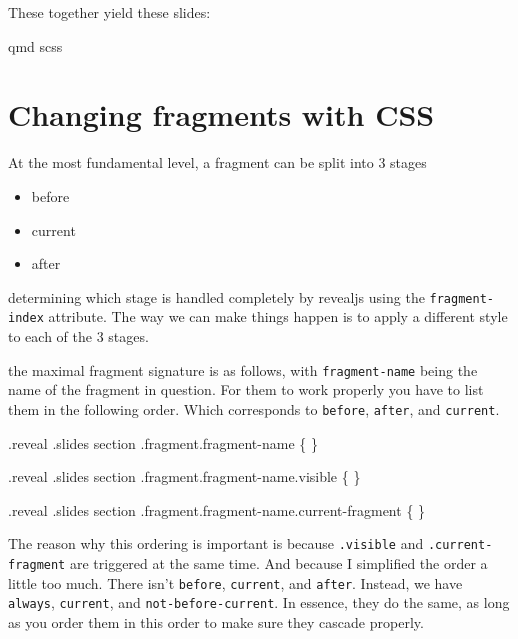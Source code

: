 \documentclass[
  letterpaper,
  DIV=11,
  numbers=noendperiod]{scrreprt}
\newenvironment{Shaded}{\begin{snugshade}}{\end{snugshade}}
\newcommand{\FunctionTok}[1]{\textcolor[rgb]{0.28,0.35,0.67}{#1}}
\newcommand{\NormalTok}[1]{\textcolor[rgb]{0.00,0.23,0.31}{#1}}
\providecommand{\tightlist}{%
  \setlength{\itemsep}{0pt}\setlength{\parskip}{0pt}}\usepackage{longtable,booktabs,array}
\begin{document}
These together yield these slides:

qmd scss

\section{Changing fragments with CSS}\label{changing-fragments-with-css}

At the most fundamental level, a fragment can be split into 3 stages

\begin{itemize}
\tightlist
\item
  before
\item
  current
\item
  after
\end{itemize}

determining which stage is handled completely by revealjs using the
\texttt{fragment-index} attribute. The way we can make things happen is
to apply a different style to each of the 3 stages.

the maximal fragment signature is as follows, with
\texttt{fragment-name} being the name of the fragment in question. For
them to work properly you have to list them in the following order.
Which corresponds to \texttt{before}, \texttt{after}, and
\texttt{current}.

\begin{Shaded}
\begin{Highlighting}[]
\FunctionTok{.reveal} \FunctionTok{.slides}\NormalTok{ section }\FunctionTok{.fragment.fragment{-}name}\NormalTok{ \{}
\NormalTok{\}}

\FunctionTok{.reveal} \FunctionTok{.slides}\NormalTok{ section }\FunctionTok{.fragment.fragment{-}name.visible}\NormalTok{ \{}
\NormalTok{\}}

\FunctionTok{.reveal} \FunctionTok{.slides}\NormalTok{ section }\FunctionTok{.fragment.fragment{-}name.current{-}fragment}\NormalTok{ \{}
\NormalTok{\}}
\end{Highlighting}
\end{Shaded}

\begin{tcolorbox}[enhanced jigsaw, titlerule=0mm, bottomrule=.15mm, opacityback=0, colbacktitle=quarto-callout-important-color!10!white, colframe=quarto-callout-important-color-frame, coltitle=black, breakable, toprule=.15mm, colback=white, bottomtitle=1mm, title=\textcolor{quarto-callout-important-color}{\faExclamation}\hspace{0.5em}{Important}, toptitle=1mm, arc=.35mm, left=2mm, leftrule=.75mm, rightrule=.15mm, opacitybacktitle=0.6]

The reason why this ordering is important is because \texttt{.visible}
and \texttt{.current-fragment} are triggered at the same time. And
because I simplified the order a little too much. There isn't
\texttt{before}, \texttt{current}, and \texttt{after}. Instead, we have
\texttt{always}, \texttt{current}, and \texttt{not-before-current}. In
essence, they do the same, as long as you order them in this order to
make sure they cascade properly.

\end{tcolorbox}
\end{document}
